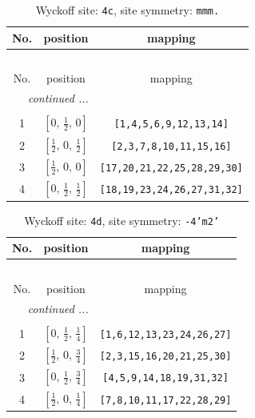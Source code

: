 \documentclass[fleqn,8pt]{jsarticle}
\begin{document}
\renewcommand{\arraystretch}{1.2}
\begin{longtable}{ccc}
\caption{Wyckoff site: {\tt 4c}, site symmetry: {\tt mmm.}}
 \\
 \hline \hline
No. & position & mapping \\ \hline \endfirsthead

\multicolumn{2}{l}{\tablename\ \thetable{}} \\
 \hline \hline
No. & position & mapping \\ \hline \endhead

 \hline \hline
\multicolumn{2}{r}{\footnotesize\it continued ...} \\ \endfoot

 \hline \hline
\multicolumn{2}{r}{} \\ \endlastfoot

1 & $\left[ 0,\, \frac{1}{2},\, 0 \right]$ & {\tt [1,4,5,6,9,12,13,14]} \\ \hline
2 & $\left[ \frac{1}{2},\, 0,\, \frac{1}{2} \right]$ & {\tt [2,3,7,8,10,11,15,16]} \\ \hline
3 & $\left[ \frac{1}{2},\, 0,\, 0 \right]$ & {\tt [17,20,21,22,25,28,29,30]} \\ \hline
4 & $\left[ 0,\, \frac{1}{2},\, \frac{1}{2} \right]$ & {\tt [18,19,23,24,26,27,31,32]} \\
\end{longtable}
\renewcommand{\arraystretch}{1.2}
\begin{longtable}{ccc}
\caption{Wyckoff site: {\tt 4d}, site symmetry: {\tt -4'm2'}}
 \\
 \hline \hline
No. & position & mapping \\ \hline \endfirsthead

\multicolumn{2}{l}{\tablename\ \thetable{}} \\
 \hline \hline
No. & position & mapping \\ \hline \endhead

 \hline \hline
\multicolumn{2}{r}{\footnotesize\it continued ...} \\ \endfoot

 \hline \hline
\multicolumn{2}{r}{} \\ \endlastfoot

1 & $\left[ 0,\, \frac{1}{2},\, \frac{1}{4} \right]$ & {\tt [1,6,12,13,23,24,26,27]} \\ \hline
2 & $\left[ \frac{1}{2},\, 0,\, \frac{3}{4} \right]$ & {\tt [2,3,15,16,20,21,25,30]} \\ \hline
3 & $\left[ 0,\, \frac{1}{2},\, \frac{3}{4} \right]$ & {\tt [4,5,9,14,18,19,31,32]} \\ \hline
4 & $\left[ \frac{1}{2},\, 0,\, \frac{1}{4} \right]$ & {\tt [7,8,10,11,17,22,28,29]} \\
\end{longtable}
\end{document}
